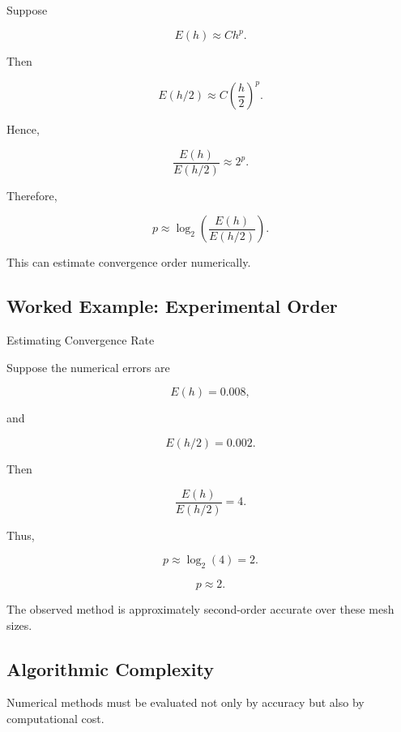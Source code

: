 Suppose

\[
E(h)
\approx
Ch^p.
\]

Then

\[
E(h/2)
\approx
C
\left(
\frac{h}{2}
\right)^p.
\]

Hence,

\[
\frac{
E(h)
}{
E(h/2)
}
\approx
2^p.
\]

Therefore,

\[
\boxed{
p
\approx
\log_2
\left(
\frac{
E(h)
}{
E(h/2)
}
\right).
}
\]

This can estimate convergence order numerically.

\subsection{Worked Example: Experimental Order}
\label{subsec:worked-experimental-order}

\begin{workedexamplebox}{Estimating Convergence Rate}

Suppose the numerical errors are

\[
E(h)=0.008,
\]

and

\[
E(h/2)=0.002.
\]

Then

\[
\frac{
E(h)
}{
E(h/2)
}
=
4.
\]

Thus,

\[
p
\approx
\log_2(4)
=
2.
\]

\begin{answerbox}
\[
\boxed{
p\approx2.
}
\]
\end{answerbox}

The observed method is approximately second-order accurate over these mesh
sizes.

\end{workedexamplebox}

\subsection{Algorithmic Complexity}
\label{subsec:numerical-algorithmic-complexity}

Numerical methods must be evaluated not only by accuracy but also by
computational cost.

